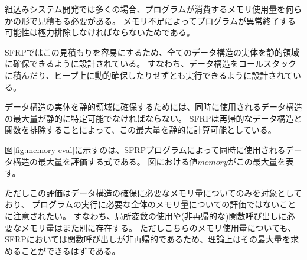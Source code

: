 組込みシステム開発では多くの場合、プログラムが消費するメモリ使用量を何らかの形で見積もる必要がある。
メモリ不足によってプログラムが異常終了する可能性は極力排除しなければならないためである。

SFRPではこの見積もりを容易にするため、全てのデータ構造の実体を静的領域に確保できるように設計されている。
すなわち、データ構造をコールスタックに積んだり、ヒープ上に動的確保したりせずとも実行できるように設計されている。

データ構造の実体を静的領域に確保するためには、同時に使用されるデータ構造の最大量が静的に特定可能でなければならない。
SFRPは再帰的なデータ構造と関数を排除することによって、この最大量を静的に計算可能としている。

図\ref{fig:memory-eval}に示すのは、SFRPプログラムによって同時に使用されるデータ構造の最大量を評価する式である。
図における値$memory$がこの最大量を表す。

ただしこの評価はデータ構造の確保に必要なメモリ量についてのみを対象としており、
プログラムの実行に必要な全体のメモリ量についての評価ではないことに注意されたい。
すなわち、局所変数の使用や(非再帰的な)関数呼び出しに必要なメモリ量はまた別に存在する。
ただしこちらのメモリ使用量についても、SFRPにおいては関数呼び出しが非再帰的であるため、理論上はその最大量を求めることができるはずである。

